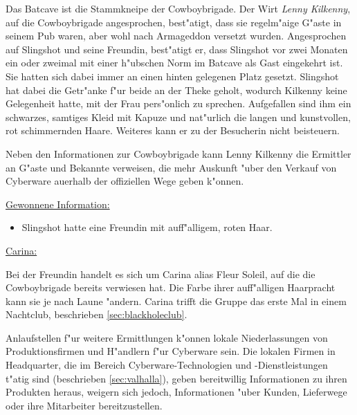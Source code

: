 
Das Batcave ist die Stammkneipe der Cowboybrigade. Der Wirt \emph{Lenny Kilkenny}, auf die Cowboybrigade angesprochen, best"atigt, dass sie regelm"a\3ige G"aste in seinem Pub waren, aber wohl nach Armageddon versetzt wurden. Angesprochen auf Slingshot und seine Freundin, best"atigt er, dass Slingshot vor zwei Monaten ein oder zweimal mit einer h"ubschen Norm im Batcave als Gast eingekehrt ist. Sie hatten sich dabei immer an einen hinten gelegenen Platz gesetzt. Slingshot hat dabei die Getr"anke f"ur beide an der Theke geholt, wodurch Kilkenny keine Gelegenheit hatte, mit der Frau pers"onlich zu sprechen. Aufgefallen sind ihm ein schwarzes, samtiges Kleid mit Kapuze und nat"urlich die langen und kunstvollen, rot schimmernden Haare. Weiteres kann er zu der Besucherin nicht beisteuern.

Neben den Informationen zur Cowboybrigade kann Lenny Kilkenny die Ermittler an G"aste und Bekannte verweisen, die mehr Auskunft "uber den Verkauf von Cyberware au\3erhalb der offiziellen Wege geben k"onnen.

\begin{remarks}
	\underline{Gewonnene Information:}
	
	\begin{itemize}
		\item Slingshot hatte eine Freundin mit auff"alligem, roten Haar.
	\end{itemize}
	
	\underline{Carina:}

	Bei der Freundin handelt es sich um Carina alias Fleur Soleil, auf die die Cowboybrigade bereits verwiesen hat. Die Farbe ihrer auff"alligen Haarpracht kann sie je nach Laune "andern. Carina trifft die Gruppe das erste Mal in einem Nachtclub, beschrieben  \cref{sec:blackholeclub}.
\end{remarks}	


Anlaufstellen f"ur weitere Ermittlungen k"onnen lokale Niederlassungen von Produktionsfirmen und H"andlern f"ur Cyberware sein. Die lokalen Firmen in Headquarter, die im Bereich Cyberware-Technologien und -Dienstleistungen t"atig sind (beschrieben \cref{sec:valhalla}), geben bereitwillig Informationen zu ihren Produkten heraus, weigern sich jedoch, Informationen "uber Kunden, Lieferwege oder ihre Mitarbeiter bereitzustellen.

